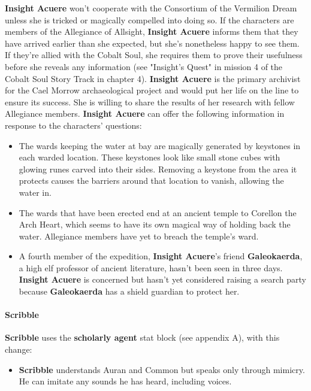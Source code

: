 \documentclass[10pt,a4,twoside,twocolumn,openany,nodeprecatedcode]{dndbook}
\begin{document}
\textbf{Insight Acuere} won't cooperate with the Consortium of the Vermilion Dream unless she is tricked or magically compelled into doing so. If the characters are members of the Allegiance of Allsight, \textbf{Insight Acuere} informs them that they have arrived earlier than she expected, but she's nonetheless happy to see them. If they're allied with the Cobalt Soul, she requires them to prove their usefulness before she reveals any information (see "Insight's Quest" in mission 4 of the Cobalt Soul Story Track in chapter 4).
\textbf{Insight Acuere} is the primary archivist for the Cael Morrow archaeological project and would put her life on the line to ensure its success. She is willing to share the results of her research with fellow Allegiance members. \textbf{Insight Acuere} can offer the following information in response to the characters' questions:
\begin{itemize}

\item The wards keeping the water at bay are magically generated by keystones in each warded location. These keystones look like small stone cubes with glowing runes carved into their sides. Removing a keystone from the area it protects causes the barriers around that location to vanish, allowing the water in.
\item The wards that have been erected end at an ancient temple to Corellon the Arch Heart, which seems to have its own magical way of holding back the water. Allegiance members have yet to breach the temple's ward.
\item A fourth member of the expedition, \textbf{Insight Acuere}'s friend \textbf{Galeokaerda}, a high elf professor of ancient literature, hasn't been seen in three days. \textbf{Insight Acuere} is concerned but hasn't yet considered raising a search party because \textbf{Galeokaerda} has a shield guardian to protect her.
\end{itemize}


\paragraph{Scribble}
\textbf{Scribble} uses the \textbf{scholarly agent} stat block (see appendix A), with this change:
\begin{itemize}

\item \textbf{Scribble} understands Auran and Common but speaks only through mimicry. He can imitate any sounds he has heard, including voices.
\end{itemize}
\end{document}
